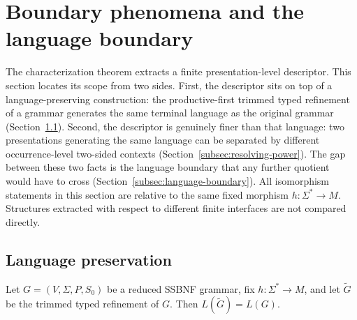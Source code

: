 \documentclass[sub]{jalc}
\newcommand{\Gtrim}{\widetilde G}
\begin{document}
\section{Boundary phenomena and the language boundary}
\label{sec:non-rigidity}

The characterization theorem extracts a finite presentation-level descriptor. This section locates its scope from two sides. First, the descriptor sits on top of a language-preserving construction: the productive-first trimmed typed refinement of a grammar generates the same terminal language as the original grammar (Section~\ref{subsec:language-preservation}). Second, the descriptor is genuinely finer than that language: two presentations generating the same language can be separated by different occurrence-level two-sided contexts (Section~\ref{subsec:resolving-power}). The gap between these two facts is the language boundary that any further quotient would have to cross (Section~\ref{subsec:language-boundary}). All isomorphism statements in this section are relative to the same fixed morphism \(h:\Sigma^*\to M\). Structures extracted with respect to different finite interfaces are not compared directly.

\subsection{Language preservation}
\label{subsec:language-preservation}

\begin{proposition}
\label{prop:language-preservation-single}
Let \(G=(V,\Sigma,P,S_0)\) be a reduced SSBNF grammar, fix \(h:\Sigma^*\to M\), and let \(\Gtrim\) be the trimmed typed refinement of \(G\). Then \(L(\Gtrim)=L(G)\).
\end{proposition}
\end{document}
